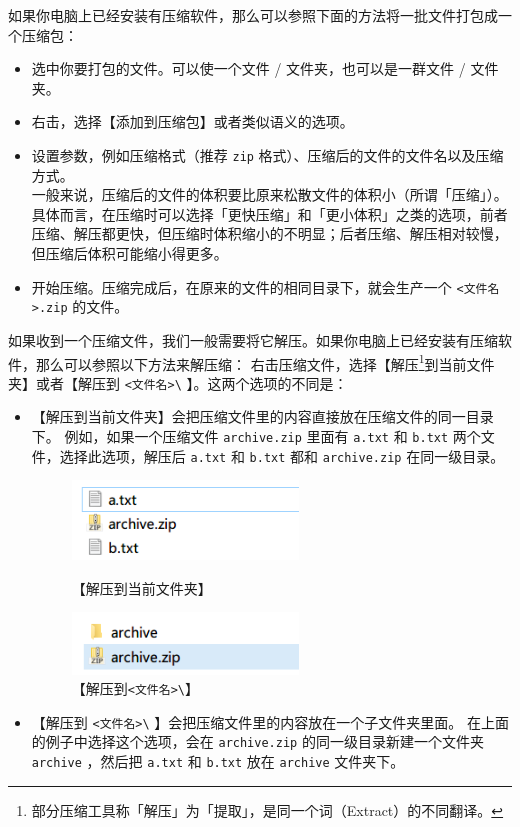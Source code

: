 如果你电脑上已经安装有压缩软件，那么可以参照下面的方法将一批文件打包成一个压缩包：


\begin{itemize}
  \item 选中你要打包的文件。可以使一个文件 / 文件夹，也可以是一群文件 / 文件夹。
  \item 右击，选择【添加到压缩包】或者类似语义的选项。
  \item 设置参数，例如压缩格式（推荐 \verb|zip| 格式）、压缩后的文件的文件名以及压缩方式。\\
    一般来说，压缩后的文件的体积要比原来松散文件的体积小（所谓「压缩」）。
    具体而言，在压缩时可以选择「更快压缩」和「更小体积」之类的选项，前者压缩、解压都更快，但压缩时体积缩小的不明显；后者压缩、解压相对较慢，但压缩后体积可能缩小得更多。
  \item 开始压缩。压缩完成后，在原来的文件的相同目录下，就会生产一个 \verb|<文件名>.zip| 的文件。
\end{itemize}

如果收到一个压缩文件，我们一般需要将它解压。如果你电脑上已经安装有压缩软件，那么可以参照以下方法来解压缩：
右击压缩文件，选择【解压\footnote{部分压缩工具称「解压」为「提取」，是同一个词（Extract）的不同翻译。}到当前文件夹】或者【解压到 \verb|<文件名>\| 】。这两个选项的不同是：

\begin{itemize}
  \item 【解压到当前文件夹】会把压缩文件里的内容直接放在压缩文件的同一目录下。
    例如，如果一个压缩文件 \verb|archive.zip| 里面有 \verb|a.txt| 和 \verb|b.txt| 两个文件，选择此选项，解压后 \verb|a.txt| 和 \verb|b.txt| 都和 \verb|archive.zip| 在同一级目录。 
    \begin{figure}[htb!]
      \centering
      \begin{minipage}{6.2cm}
        \centering
        \includegraphics[width=6cm]{assets/Decompress_Current.png}
        \caption{【解压到当前文件夹】}
        \label{Decompress_Current}
      \end{minipage}
      \qquad
      \begin{minipage}{6.2cm}
        \centering
        \includegraphics[width=6cm]{assets/Decompress_Sub.png}
        \caption{【解压到\texttt{<文件名>\textbackslash}】}
        \label{Decompress_Sub}
      \end{minipage}
    \end{figure}
  \item 【解压到 \verb|<文件名>\| 】会把压缩文件里的内容放在一个子文件夹里面。
    在上面的例子中选择这个选项，会在 \verb|archive.zip| 的同一级目录新建一个文件夹 \verb|archive| ，然后把 \verb|a.txt| 和 \verb|b.txt| 放在 \verb|archive| 文件夹下。
\end{itemize}

